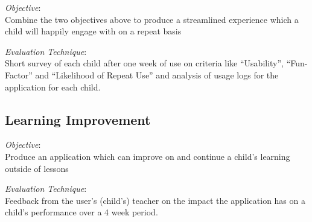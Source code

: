 \emph{Objective}: \\
Combine the two objectives above to produce a streamlined experience which a child will happily engage with on a repeat basis

\emph{Evaluation Technique}: \\
Short survey of each child after one week of use on criteria like ``Usability'', ``Fun-Factor'' and ``Likelihood of Repeat Use'' and analysis of usage logs for the application for each child.

\subsection{Learning Improvement}

\emph{Objective}: \\
Produce an application which can improve on and continue a child's learning outside of lessons

\emph{Evaluation Technique}: \\
Feedback from the user's (child's) teacher on the impact the application has on a child's performance over a 4 week period.